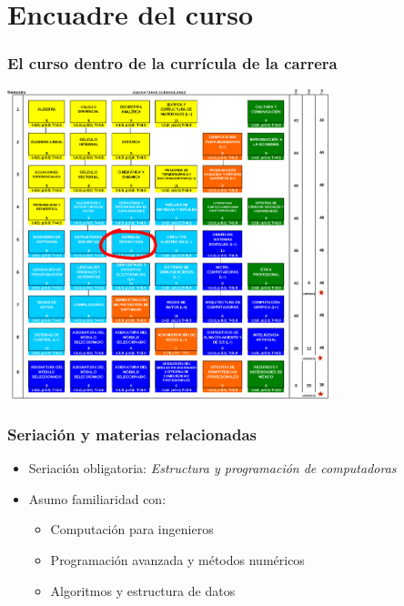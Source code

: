 \documentclass[bigger]{beamer}
\begin{document}
\section{Encuadre del curso}
\label{sec-2}
\begin{frame}[fragile]\frametitle{El curso dentro de la currícula de la carrera}
\label{sec-2_1}

\begin{center}
\includegraphics[width=0.7\textwidth]{../img/pres/mapa_curricular.png}
\end{center}
\end{frame}
\begin{frame}[fragile]\frametitle{Seriación y materias relacionadas}
\label{sec-2_2}

\begin{itemize}
\item Seriación obligatoria: \emph{Estructura y programación de computadoras}
\item Asumo familiaridad con:

\begin{itemize}
\item Computación para ingenieros
\item Programación avanzada y métodos numéricos
\item Algoritmos y estructura de datos
\end{itemize}

\end{itemize}
\end{frame}
\end{document}
